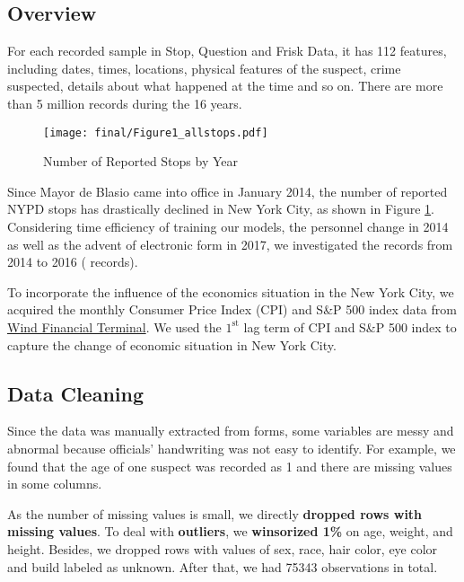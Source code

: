 \subsection{Overview}

For each recorded sample in Stop, Question and Frisk Data, it has 112 features, including dates, times, locations, physical features of the suspect, crime suspected, details about what happened at the time and so on. There are more than 5 million records during the 16 years. 

\begin{figure}[htbp]
    \centering
    \texttt{[image: final/Figure1\_allstops.pdf]}
    \caption{Number of Reported Stops by Year}
    \label{fig:stops}
\end{figure}

Since Mayor de Blasio came into office in January 2014, the number of reported NYPD stops has drastically declined in New York City, as shown in Figure \ref{fig:stops}.
Considering time efficiency of training our models, the personnel change in 2014 as well as the advent of electronic form in 2017,  we investigated the records from 2014 to 2016 ( records).

To incorporate the influence of the economics situation in the New York City, we acquired the monthly Consumer Price Index (CPI) and S\&P 500 index data from \href{https://www.wind.com.cn/en/wft.html}{Wind Financial Terminal}. We used the $1^{\text{st}}$ lag term of CPI and S\&P 500 index to capture the change of economic situation in New York City.

\subsection{Data Cleaning}

Since the data was manually extracted from forms, some variables are messy and abnormal because officials' handwriting was not easy to identify. For example, we found that the age of one suspect was recorded as 1 and there are missing values in some columns. 

As the number of missing values is small, we directly \textbf{dropped rows with missing values}. To deal with \textbf{outliers}, we \textbf{winsorized 1\%} on age, weight, and height. Besides, we dropped rows with values of sex, race, hair color, eye color and build labeled as unknown. 
After that, we had 75343 observations in total. 

